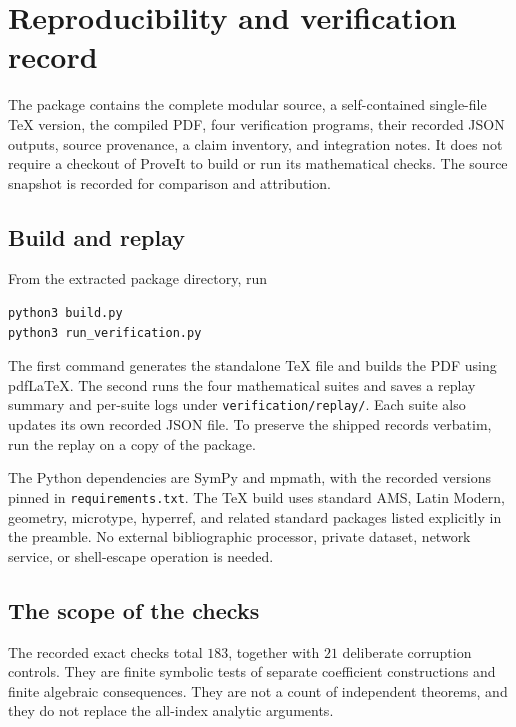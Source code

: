 \section{Reproducibility and verification record}
\label{repro:section}

The package contains the complete modular source, a self-contained
single-file TeX version, the compiled PDF, four verification
programs, their recorded JSON outputs, source provenance, a claim
inventory, and integration notes. It does not require a checkout
of ProveIt to build or run its mathematical checks. The source
snapshot is recorded for comparison and attribution.

\subsection{Build and replay}

From the extracted package directory, run
\begin{verbatim}
python3 build.py
python3 run_verification.py
\end{verbatim}
The first command generates the standalone TeX file and builds the
PDF using pdfLaTeX. The second runs the four mathematical suites
and saves a replay summary and per-suite logs under
\texttt{verification/replay/}. Each suite also updates its own
recorded JSON file. To preserve the shipped records verbatim,
run the replay on a copy of the package.

The Python dependencies are SymPy and mpmath, with the recorded
versions pinned in \texttt{requirements.txt}. The TeX build uses
standard AMS, Latin Modern, geometry, microtype, hyperref, and
related standard packages listed explicitly in the preamble.
No external bibliographic processor, private dataset, network
service, or shell-escape operation is needed.

\subsection{The scope of the checks}

The recorded exact checks total $183$, together with $21$
deliberate corruption controls. They are finite symbolic tests
of separate coefficient constructions and finite algebraic
consequences. They are not a count of independent theorems, and
they do not replace the all-index analytic arguments.

